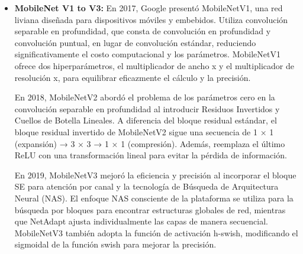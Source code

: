 \begin{itemize}
	\item \textbf{MobileNet V1 to V3:} En 2017, Google presentó MobileNetV1, una red liviana diseñada para dispositivos móviles y embebidos. Utiliza convolución separable en profundidad, que consta de convolución en profundidad y convolución puntual, en lugar de convolución estándar, reduciendo significativamente el costo computacional y los parámetros. MobileNetV1 ofrece dos hiperparámetros, el multiplicador de ancho x y el multiplicador de resolución x, para equilibrar eficazmente el cálculo y la precisión.
	
	En 2018, MobileNetV2 abordó el problema de los parámetros cero en la convolución separable en profundidad al introducir Residuos Invertidos y Cuellos de Botella Lineales. A diferencia del bloque residual estándar, el bloque residual invertido de MobileNetV2 sigue una secuencia de 1 × 1 (expansión) → 3 × 3 → 1 × 1 (compresión). Además, reemplaza el último ReLU con una transformación lineal para evitar la pérdida de información.
	
	En 2019, MobileNetV3 mejoró la eficiencia y precisión al incorporar el bloque SE para atención por canal y la tecnología de Búsqueda de Arquitectura Neural (NAS). El enfoque NAS consciente de la plataforma se utiliza para la búsqueda por bloques para encontrar estructuras globales de red, mientras que NetAdapt ajusta individualmente las capas de manera secuencial. MobileNetV3 también adopta la función de activación h-swish, modificando el sigmoidal de la función swish para mejorar la precisión.
	

\end{itemize}
